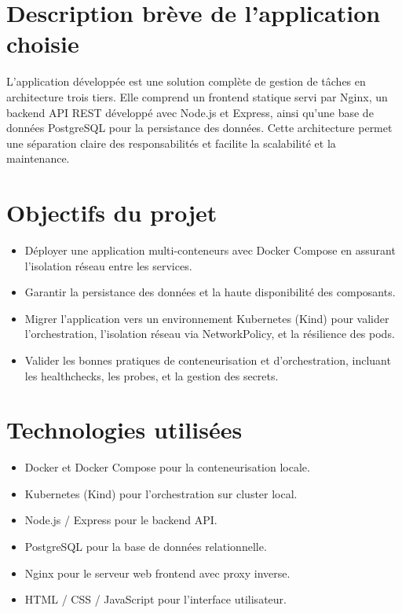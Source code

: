 \documentclass[11pt,a4paper,oneside]{report}
\begin{document}
\section{Description brève de l'application choisie}
L'application développée est une solution complète de gestion de tâches en architecture trois tiers. Elle comprend un frontend statique servi par Nginx, un backend API REST développé avec Node.js et Express, ainsi qu'une base de données PostgreSQL pour la persistance des données. Cette architecture permet une séparation claire des responsabilités et facilite la scalabilité et la maintenance.

\section{Objectifs du projet}
\begin{itemize}
\item Déployer une application multi-conteneurs avec Docker Compose en assurant l'isolation réseau entre les services.
\item Garantir la persistance des données et la haute disponibilité des composants.
\item Migrer l'application vers un environnement Kubernetes (Kind) pour valider l'orchestration, l'isolation réseau via NetworkPolicy, et la résilience des pods.
\item Valider les bonnes pratiques de conteneurisation et d'orchestration, incluant les healthchecks, les probes, et la gestion des secrets.
\end{itemize}

\section{Technologies utilisées}
\begin{itemize}
\item Docker et Docker Compose pour la conteneurisation locale.
\item Kubernetes (Kind) pour l'orchestration sur cluster local.
\item Node.js / Express pour le backend API.
\item PostgreSQL pour la base de données relationnelle.
\item Nginx pour le serveur web frontend avec proxy inverse.
\item HTML / CSS / JavaScript pour l'interface utilisateur.
\end{itemize}
\end{document}
